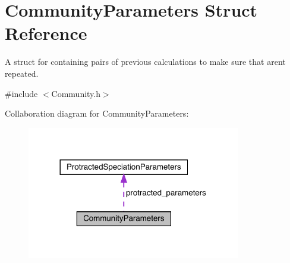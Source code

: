 \hypertarget{struct_community_parameters}{}\section{Community\+Parameters Struct Reference}
\label{struct_community_parameters}


A struct for containing pairs of previous calculations to make sure that aren\textquotesingle{}t repeated.  




{\ttfamily \#include $<$Community.\+h$>$}



Collaboration diagram for Community\+Parameters\+:
\nopagebreak
\begin{figure}[H]
\begin{center}
\leavevmode
\includegraphics[width=264pt]{struct_community_parameters__coll__graph}
\end{center}
\end{figure}
